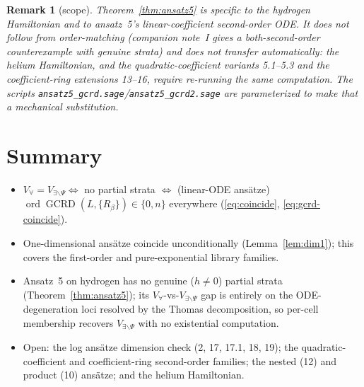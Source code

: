 \documentclass[11pt]{article}
\newcommand{\code}[1]{\texttt{#1}}
\DeclareMathOperator{\GCRD}{GCRD}
\DeclareMathOperator{\ord}{ord}
\newcommand{\Vall}{V_{\forall}}
\newcommand{\Vex}{V_{\exists\backslash\Psi}}
\newtheorem{remark}{Remark}
\begin{document}
\begin{remark}[scope]
Theorem~\ref{thm:ansatz5} is specific to the \emph{hydrogen} Hamiltonian and to
ansatz~5's linear-coefficient second-order ODE. It does not follow from
order-matching (companion note~I gives a both-second-order counterexample with
genuine strata) and does not transfer automatically: the helium Hamiltonian,
and the quadratic-coefficient variants 5.1--5.3 and the coefficient-ring
extensions 13--16, require re-running the same computation. The scripts
\code{ansatz5\_gcrd.sage}/\code{ansatz5\_gcrd2.sage} are parameterized to make
that a mechanical substitution.
\end{remark}

\section{Summary}

\begin{itemize}
\item $\Vall=\Vex\iff$ no partial strata $\iff$ (linear-ODE ans\"atze)
      $\ord\GCRD(L,\{R_\beta\})\in\{0,n\}$ everywhere (\eqref{eq:coincide},
      \eqref{eq:gcrd-coincide}).
\item One-dimensional ans\"atze coincide unconditionally
      (Lemma~\ref{lem:dim1}); this covers the first-order and pure-exponential
      library families.
\item Ansatz~5 on hydrogen has no genuine ($h\neq0$) partial strata
      (Theorem~\ref{thm:ansatz5}); its $\Vall$-vs-$\Vex$ gap is entirely on the
      ODE-degeneration loci resolved by the Thomas decomposition, so per-cell
      membership recovers $\Vex$ with no existential computation.
\item Open: the log ans\"atze dimension check (2, 17, 17.1, 18, 19); the
      quadratic-coefficient and coefficient-ring second-order families; the
      nested (12) and product (10) ans\"atze; and the helium Hamiltonian.
\end{itemize}
\end{document}
